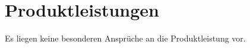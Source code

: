 \section{Produktleistungen}
\label{sec:Produktleistungen}

Es liegen keine besonderen Ansprüche an die Produktleistung vor.
